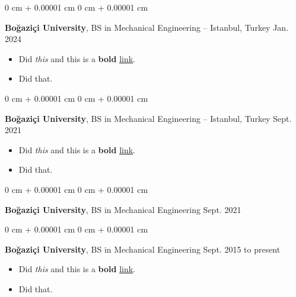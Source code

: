 \documentclass[10pt, letterpaper]{article}
\newenvironment{highlights}{
    \begin{itemize}[
        topsep=0.10 cm,
        parsep=0.10 cm,
        partopsep=0pt,
        itemsep=0pt,
        leftmargin=0 cm + 10pt
    ]
}{
    \end{itemize}
        
    \vspace{-0.20cm}
} %
\newenvironment{onecolentry}{
    \begin{adjustwidth}{
        0 cm + 0.00001 cm
    }{
        0 cm + 0.00001 cm
    }
}{
    \end{adjustwidth}
} %
\begin{document}
        \vspace{0.1 cm}

        \begin{onecolentry}
            \textbf{Boğaziçi University}, BS in Mechanical Engineering -- Istanbul, Turkey \hfill Jan. 2024
            \begin{highlights}
                \item Did \textit{this} and this is a \textbf{bold} \href{https://example.com}{link}.
                \item Did that.
            \end{highlights}
        \end{onecolentry}

        \vspace{0.1 cm}

        \begin{onecolentry}
            \textbf{Boğaziçi University}, BS in Mechanical Engineering -- Istanbul, Turkey \hfill Sept. 2021
            \begin{highlights}
                \item Did \textit{this} and this is a \textbf{bold} \href{https://example.com}{link}.
                \item Did that.
            \end{highlights}
        \end{onecolentry}

        \vspace{0.1 cm}

        \begin{onecolentry}
            \textbf{Boğaziçi University}, BS in Mechanical Engineering \hfill Sept. 2021
        \end{onecolentry}

        \vspace{0.1 cm}

        \begin{onecolentry}
            \textbf{Boğaziçi University}, BS in Mechanical Engineering \hfill Sept. 2015 to present
            \begin{highlights}
                \item Did \textit{this} and this is a \textbf{bold} \href{https://example.com}{link}.
                \item Did that.
            \end{highlights}
        \end{onecolentry}

        \vspace{0.1 cm}
\end{document}
